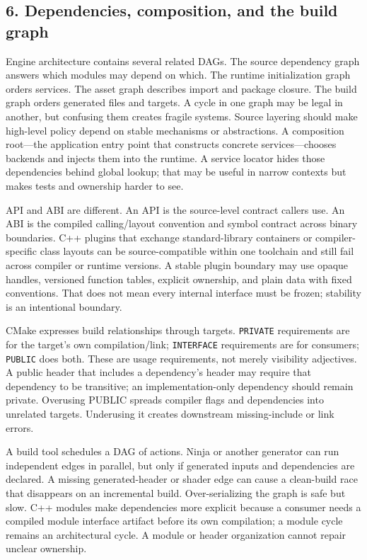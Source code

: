 \subsection{6. Dependencies, composition, and the build graph}\label{05-engine-i-ch008-dependencies-composition-and-the-build-graph}

Engine architecture contains several related DAGs. The source dependency graph answers which modules may depend on which. The runtime initialization graph orders services. The asset graph describes import and package closure. The build graph orders generated files and targets. A cycle in one graph may be legal in another, but confusing them creates fragile systems. Source layering should make high-level policy depend on stable mechanisms or abstractions. A composition root---the application entry point that constructs concrete services---chooses backends and injects them into the runtime. A service locator hides those dependencies behind global lookup; that may be useful in narrow contexts but makes tests and ownership harder to see.

API and ABI are different. An API is the source-level contract callers use. An ABI is the compiled calling/layout convention and symbol contract across binary boundaries. C++ plugins that exchange standard-library containers or compiler-specific class layouts can be source-compatible within one toolchain and still fail across compiler or runtime versions. A stable plugin boundary may use opaque handles, versioned function tables, explicit ownership, and plain data with fixed conventions. That does not mean every internal interface must be frozen; stability is an intentional boundary.

CMake expresses build relationships through targets. \texttt{PRIVATE} requirements are for the target's own compilation/link; \texttt{INTERFACE} requirements are for consumers; \texttt{PUBLIC} does both. These are usage requirements, not merely visibility adjectives. A public header that includes a dependency's header may require that dependency to be transitive; an implementation-only dependency should remain private. Overusing PUBLIC spreads compiler flags and dependencies into unrelated targets. Underusing it creates downstream missing-include or link errors.

A build tool schedules a DAG of actions. Ninja or another generator can run independent edges in parallel, but only if generated inputs and dependencies are declared. A missing generated-header or shader edge can cause a clean-build race that disappears on an incremental build. Over-serializing the graph is safe but slow. C++ modules make dependencies more explicit because a consumer needs a compiled module interface artifact before its own compilation; a module cycle remains an architectural cycle. A module or header organization cannot repair unclear ownership.

